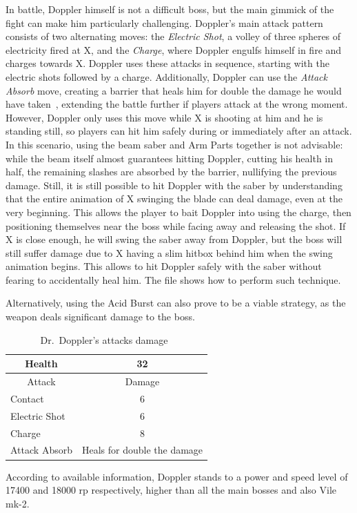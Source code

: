 In battle, Doppler himself is not a difficult boss, but the main gimmick of the fight can make him particularly challenging. Doppler's main attack pattern consists of two alternating moves: the \emph{Electric Shot}, a volley of three spheres of electricity fired at X, and the \emph{Charge}, where Doppler engulfs himself in fire and charges towards X. Doppler uses these attacks in sequence, starting with the electric shots followed by a charge. Additionally, Doppler can use the \emph{Attack Absorb} move, creating a barrier that heals him for double the damage he would have taken~\cite{wiki:X3_enemies}, extending the battle further if players attack at the wrong moment. However, Doppler only uses this move while X is shooting at him and he is standing still, so players can hit him safely during or immediately after an attack. In this scenario, using the beam saber and Arm Parts together is not advisable: while the beam itself almost guarantees hitting Doppler, cutting his health in half, the remaining slashes are absorbed by the barrier, nullifying the previous damage. Still, it is still possible to hit Doppler with the saber by understanding that the entire animation of X swinging the blade can deal damage, even at the very beginning. This allows the player to bait Doppler into using the charge, then positioning themselves near the boss while facing away and releasing the shot. If X is close enough, he will swing the saber away from Doppler, but the boss will still suffer damage due to X having a slim hitbox behind him when the swing animation begins. This allows to hit Doppler safely with the saber without fearing to accidentally heal him. The file  shows how to perform such technique.

 Alternatively, using the Acid Burst can also prove to be a viable strategy, as the weapon deals significant damage to the boss.
\begin{table}[htp]
	\centering
	\begin{tabular}[h]{l c}
		\toprule
		\multicolumn{1}{c}{Health}  & 32 \\
		\midrule
		\multicolumn{1}{c}{Attack} & \multicolumn{1}{c}{Damage}\\
		Contact & 6 \\
		Electric Shot & 6\\
		Charge & 8\\
		Attack Absorb & Heals for double the damage\\
		\bottomrule
	\end{tabular}
	\caption{Dr.~Doppler's attacks damage~\cite{wiki:Doppler,book:Compendium}}
\end{table}
According to available information, Doppler stands to a power and speed level of 17400 and 18000 rp respectively, higher than all the main bosses and also Vile mk-2.


